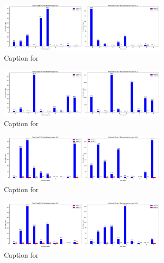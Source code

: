 \documentclass{article}
\begin{document}
\begin{figure}[!htbp]
\centering
\includegraphics[width=0.75\textwidth]{combined_class_boundary_pgd/combined_class_6_misclassifications_eps_0.2.png}
\caption{Caption for }
\label{fig:combined_class_6_misclassifications_eps_0.2.png}
\end{figure}

\begin{figure}[!htbp]
\centering
\includegraphics[width=0.75\textwidth]{combined_class_boundary_pgd/combined_class_5_misclassifications_eps_0.2.png}
\caption{Caption for }
\label{fig:combined_class_5_misclassifications_eps_0.2.png}
\end{figure}

\begin{figure}[!htbp]
\centering
\includegraphics[width=0.75\textwidth]{combined_class_boundary_pgd/combined_class_7_misclassifications_eps_0.2.png}
\caption{Caption for }
\label{fig:combined_class_7_misclassifications_eps_0.2.png}
\end{figure}

\begin{figure}[!htbp]
\centering
\includegraphics[width=0.75\textwidth]{combined_class_boundary_pgd/combined_class_8_misclassifications_eps_0.2.png}
\caption{Caption for }
\label{fig:combined_class_8_misclassifications_eps_0.2.png}
\end{figure}
\end{document}
